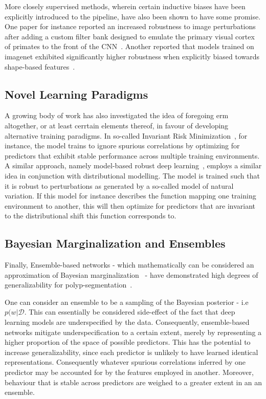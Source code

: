 More closely supervised methods, wherein certain inductive biases have been explicitly introduced to the pipeline, have also been shown to have some promise. One paper for instance reported an increased robustness to image perturbations after adding a custom filter bank designed to emulate the primary visual cortex of primates to the front of the CNN~\cite{visual_cortex}. Another reported that models trained on imagenet exhibited significantly higher robustness when explicitly biased towards shape-based features~\cite{texturebias}. 

\subsection{Novel Learning Paradigms}
A growing body of work has also investigated the idea of foregoing \gls{erm} altogether, or at least cerrtain elements thereof, in favour of developing alternative training paradigms. In so-called Invariant Risk Minimization~\cite{IRM}, for instance, the model trains to ignore spurious correlations by optimizing for predictors that exhibit stable performance across multiple training environments. A similar approach, namely model-based robust deep learning~\cite{modelbased}, employs a similar idea in conjunction with distributional modelling. The model is trained such that it is robust to perturbations as generated by a so-called model of natural variation. If this model for instance describes the function mapping one training environment to another, this will then optimize for predictors that are invariant to the distributional shift this function corresponds to. 

\subsection{Bayesian Marginalization and Ensembles}\label{background:ensembles}
Finally, Ensemble-based networks - which mathematically can be considered an approximation of Bayesian marginalization~\cite{bayesian_case,bayesian_generalization} - have demonstrated high degrees of generalizability for polyp-segmentation~\cite{divergentnets,endoensemble}. 

One can consider an ensemble to be a sampling of the Bayesian posterior - i.e \(p(w | \mathcal{D}\). This can essentially be considered side-effect of the fact that deep learning models are underspecified by the data. Consequently, ensemble-based networks mitigate underspecification to a certain extent, merely by representing a higher proportion of the space of possible predictors. This has the potential to increase generalizability, since each predictor is unlikely to have learned identical representations. Consequently whatever spurious correlations inferred by one predictor may be accounted for by the features employed in another. Moreover, behaviour that is stable across predictors are weighed to a greater extent in an an ensemble. 

